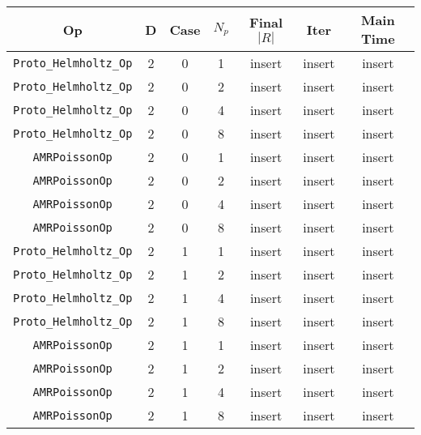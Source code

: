 \documentclass{article}
\begin{document}
\begin{small}
\begin{table}
\begin{center}
\begin{tabular}{|c|c|c|c|c|c||c|} \hline
 Op & D & Case & $N_p$ & Final $|R|$  &  Iter & Main Time \\
\hline
 {\tt Proto\_Helmholtz\_Op} & 2 & 0 &   1    &  insert  &  insert    & insert   \\
 {\tt Proto\_Helmholtz\_Op} & 2 & 0 &   2    &  insert  &  insert    & insert   \\
 {\tt Proto\_Helmholtz\_Op} & 2 & 0 &   4    &  insert  &  insert    & insert   \\
 {\tt Proto\_Helmholtz\_Op} & 2 & 0 &   8    &  insert  &  insert    & insert   \\
\hline                                                                                
 {\tt AMRPoissonOp}         & 2 & 0   & 1    &  insert  &  insert    & insert    \\
 {\tt AMRPoissonOp}         & 2 & 0   & 2    &  insert  &  insert    & insert    \\
 {\tt AMRPoissonOp}         & 2 & 0   & 4    &  insert  &  insert    & insert    \\
 {\tt AMRPoissonOp}         & 2 & 0   & 8    &  insert  &  insert    & insert    \\
\hline                                                                                     
 {\tt Proto\_Helmholtz\_Op} & 2 & 1   & 1    &  insert  &  insert    & insert   \\
 {\tt Proto\_Helmholtz\_Op} & 2 & 1   & 2    &  insert  &  insert    & insert   \\
 {\tt Proto\_Helmholtz\_Op} & 2 & 1   & 4    &  insert  &  insert    & insert   \\
 {\tt Proto\_Helmholtz\_Op} & 2 & 1   & 8    &  insert  &  insert    & insert   \\
\hline                                                                                
 {\tt AMRPoissonOp}         & 2 & 1   & 1    &  insert  &  insert    & insert    \\
 {\tt AMRPoissonOp}         & 2 & 1   & 2    &  insert  &  insert    & insert    \\
 {\tt AMRPoissonOp}         & 2 & 1   & 4    &  insert  &  insert    & insert    \\
 {\tt AMRPoissonOp}         & 2 & 1   & 8    &  insert  &  insert    & insert    \\
\hline                                                                                

\end{tabular}
\end{center}
\end{table}
\end{small}
\end{document}
